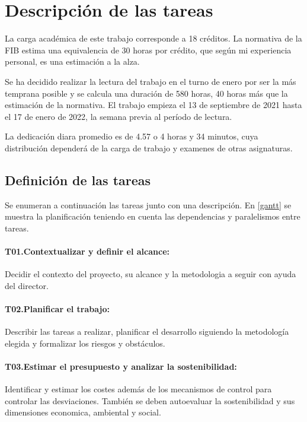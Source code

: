 
\section{Descripción de las tareas}\label{desctasks}
La carga académica de este trabajo corresponde a 18 créditos. La normativa
de la FIB estima una equivalencia de 30 horas por crédito, que según mi experiencia
personal, es una estimación a la alza.

Se ha decidido realizar la lectura del trabajo en el turno de enero por ser la más
temprana posible y se calcula una duración de 580 horas, 40 horas más que la
estimación de la normativa. El trabajo empieza el 13 de septiembre
de 2021 hasta el 17 de enero de 2022, la semana previa al período de lectura.

La dedicación diara promedio es de 4.57 o 4 horas y 34 minutos, cuya distribución dependerá
de la carga de trabajo y examenes de otras asignaturas.

\subsection{Definición de las tareas}
Se enumeran a continuación las tareas junto con una descripción. En \ref{gantt} se muestra la planificación teniendo
en cuenta las dependencias y paralelismos entre tareas.
\paragraph{T01.\quad Contextualizar y definir el alcance:}\label{T01}
Decidir el contexto del proyecto, su alcance y la metodologia a seguir con ayuda
del director.
\paragraph{T02.\quad Planificar el trabajo:}\label{T02}
Describir las tareas a realizar, planificar el desarrollo siguiendo la
metodología elegida y formalizar los riesgos y obstáculos.
\paragraph{T03.\quad Estimar el presupuesto y analizar la sostenibilidad:}\label{T03}
Identificar y estimar los costes además de los mecanismos de control para controlar las
desviaciones. También se deben autoevaluar la sostenibilidad y sus dimensiones economica,
ambiental y social.
